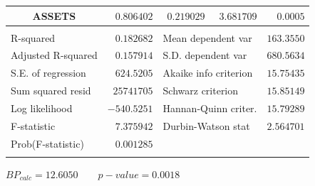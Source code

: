 \documentclass[12pt]{report}
\begin{document}
\begin{table}[H]
\begin{tabular}{lrrrr}
		\multicolumn{1}{c}{ASSETS}&\multicolumn{1}{r}{$0.806402$}&\multicolumn{1}{r}{$0.219029$}&\multicolumn{1}{r}{$3.681709$}&\multicolumn{1}{r}{$0.0005$}\\
		[4.5pt] \hline \\ [-4.5pt]
		\multicolumn{1}{l}{R-squared}&\multicolumn{1}{r}{$0.182682$}&\multicolumn{2}{l}{Mean dependent var}&\multicolumn{1}{r}{$163.3550$}\\
		\multicolumn{1}{l}{Adjusted R-squared}&\multicolumn{1}{r}{$0.157914$}&\multicolumn{2}{l}{S.D. dependent var}&\multicolumn{1}{r}{$680.5634$}\\
		\multicolumn{1}{l}{S.E. of regression}&\multicolumn{1}{r}{$624.5205$}&\multicolumn{2}{l}{Akaike info criterion}&\multicolumn{1}{r}{$15.75435$}\\
		\multicolumn{1}{l}{Sum squared resid}&\multicolumn{1}{r}{$25741705$}&\multicolumn{2}{l}{Schwarz criterion}&\multicolumn{1}{r}{$15.85149$}\\
		\multicolumn{1}{l}{Log likelihood}&\multicolumn{1}{r}{$-540.5251$}&\multicolumn{2}{l}{Hannan-Quinn criter.}&\multicolumn{1}{r}{$15.79289$}\\
		\multicolumn{1}{l}{F-statistic}&\multicolumn{1}{r}{$7.375942$}&\multicolumn{2}{l}{Durbin-Watson stat}&\multicolumn{1}{r}{$2.564701$}\\
		\multicolumn{1}{l}{Prob(F-statistic)}&\multicolumn{1}{r}{$0.001285$}&\multicolumn{1}{c}{}&\multicolumn{1}{c}{}&\multicolumn{1}{c}{}\\
		[4.5pt] \hline \\ [-4.5pt]
	\end{tabular}
\end{table}
 
\centering
$BP_{calc} = 12.6050 \qquad p-value=0.0018$
\end{document}
